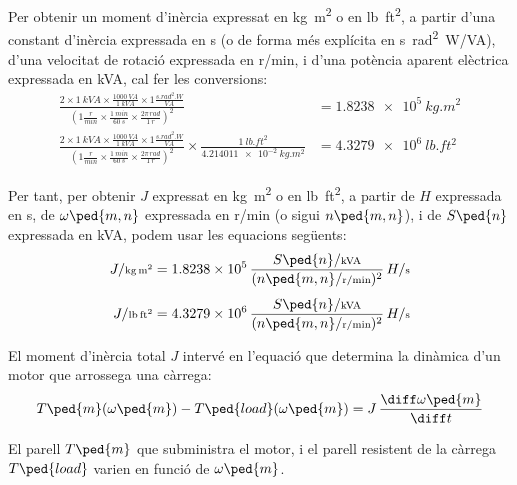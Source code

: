 Per  obtenir un moment d'inèrcia expressat en \unit{kg.m^2} o en \unit{lb.ft^2}, a partir d'una constant d'inèrcia  expressada en \unit{s} (o de forma més explícita en \unit{s.rad^2.W/VA}), d'una velocitat de rotació expressada en \unit{r/min}, i d'una potència aparent elèctrica expressada en \unit{kVA}, cal  fer les conversions:
\begin{subequations}
\begin{align}
    \frac{2\times \qty{1}{kVA} \times \frac{\qty{1000}{VA}}{\qty{1}{kVA}} \times 1 \frac{\unit{s.rad^2.W}}{\unit{VA}}}{\left(1\frac{\unit{r}}{\unit{min}} \times \frac{\qty{1}{min}}{\qty{60}{s}} \times \frac{2\pi\,\unit{rad}}{\qty{1}{r}}\right)^2}  &= \qty{1,8238e5}{kg.m^2} \\[1ex]
    \frac{2\times \qty{1}{kVA} \times \frac{\qty{1000}{VA}}{\qty{1}{kVA}} \times 1 \frac{\unit{s.rad^2.W}}{\unit{VA}}}{\left(1\frac{\unit{r}}{\unit{min}} \times \frac{\qty{1}{min}}{\qty{60}{s}} \times \frac{2\pi\,\unit{rad}}{\qty{1}{r}}\right)^2}  \times \frac{\qty{1}{lb.ft^2}}{\qty{4,214011e-2}{kg.m^2}} &= \qty{4,3279e6}{lb.ft^2}
\end{align}
\end{subequations}

Per tant, per  obtenir $J$  expressat en \unit{kg.m^2} o en \unit{lb.ft^2}, a partir de $H$ expressada en \unit{s}, de $\omega\ped{m,n}$ expressada en \unit{r/min} (o sigui $n\ped{m,n}$), i de $S\ped{n}$ expressada en \unit{kVA}, podem usar les equacions següents:
\begin{subequations}
\begin{align}
     J/{\scriptstyle \unit{kg.m^2}} &= \num{1,8238e5}\,  \frac{S\ped{n}/{\scriptstyle \unit{kVA}}}{(n\ped{m,n}/{\scriptstyle \unit{r/min}})^2} \, H/{\scriptstyle \unit{s}}\\[1ex]
    J/{\scriptstyle \unit{lb.ft^2}} &= \num{4,3279e6}\,  \frac{S\ped{n}/{\scriptstyle \unit{kVA}}}{(n\ped{m,n}/{\scriptstyle \unit{r/min}})^2} \, H/{\scriptstyle \unit{s}}
\end{align}
\end{subequations}

El moment d'inèrcia total $J$ intervé en l'equació que  determina la dinàmica d'un motor que arrossega una càrrega:
\begin{equation}\label{eq:Tm-Tl-vel}
    T\ped{m}(\omega\ped{m}) - T\ped{load}(\omega\ped{m}) = J\,\frac{\diff \omega\ped{m}}{\diff t}
\end{equation}

El parell $T\ped{m}$ que subministra el motor, i el parell resistent de la càrrega $T\ped{load}$ varien en funció de $\omega\ped{m}$.


